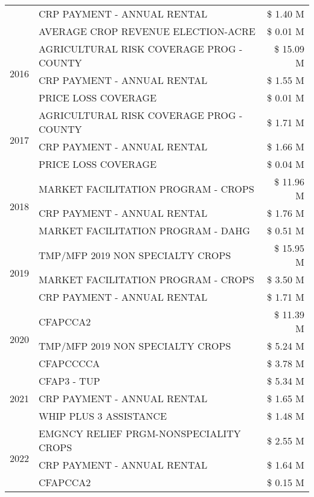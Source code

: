 \begin{tabular}{llr}
 & CRP PAYMENT - ANNUAL RENTAL & \$ 1.40 M \\
 & AVERAGE CROP REVENUE ELECTION-ACRE & \$ 0.01 M \\
\cline{1-3}
\multirow[t]{3}{*}{2016} & AGRICULTURAL RISK COVERAGE PROG - COUNTY & \$ 15.09 M \\
 & CRP PAYMENT - ANNUAL RENTAL & \$ 1.55 M \\
 & PRICE LOSS COVERAGE & \$ 0.01 M \\
\cline{1-3}
\multirow[t]{3}{*}{2017} & AGRICULTURAL RISK COVERAGE PROG - COUNTY & \$ 1.71 M \\
 & CRP PAYMENT - ANNUAL RENTAL & \$ 1.66 M \\
 & PRICE LOSS COVERAGE & \$ 0.04 M \\
\cline{1-3}
\multirow[t]{3}{*}{2018} & MARKET FACILITATION PROGRAM - CROPS & \$ 11.96 M \\
 & CRP PAYMENT - ANNUAL RENTAL & \$ 1.76 M \\
 & MARKET FACILITATION PROGRAM - DAHG & \$ 0.51 M \\
\cline{1-3}
\multirow[t]{3}{*}{2019} & TMP/MFP 2019 NON SPECIALTY CROPS & \$ 15.95 M \\
 & MARKET FACILITATION PROGRAM - CROPS & \$ 3.50 M \\
 & CRP PAYMENT - ANNUAL RENTAL & \$ 1.71 M \\
\cline{1-3}
\multirow[t]{3}{*}{2020} & CFAPCCA2 & \$ 11.39 M \\
 & TMP/MFP 2019 NON SPECIALTY CROPS & \$ 5.24 M \\
 & CFAPCCCCA & \$ 3.78 M \\
\cline{1-3}
\multirow[t]{3}{*}{2021} & CFAP3 - TUP & \$ 5.34 M \\
 & CRP PAYMENT - ANNUAL RENTAL & \$ 1.65 M \\
 & WHIP PLUS 3 ASSISTANCE & \$ 1.48 M \\
\cline{1-3}
\multirow[t]{3}{*}{2022} & EMGNCY RELIEF PRGM-NONSPECIALITY CROPS & \$ 2.55 M \\
 & CRP PAYMENT - ANNUAL RENTAL & \$ 1.64 M \\
 & CFAPCCA2 & \$ 0.15 M \\
\cline{1-3}
\bottomrule
\end{tabular}
